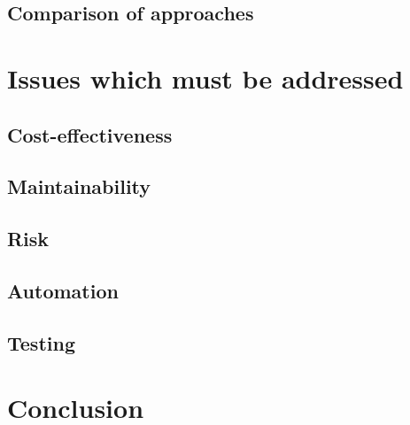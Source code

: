 \documentclass[12pt,journal,compsoc]{IEEEtran}
\begin{document}
\subsection{Comparison of approaches}
\label{subsec:comparison}

\section{Issues which must be addressed}
\label{sec:issues}

\subsection{Cost-effectiveness}
\label{subsec:costeffectiveness}

\subsection{Maintainability}
\label{subsec:maintainability}

\subsection{Risk}
\label{subsec:risk}

\subsection{Automation}
\label{subsec:automation}

\subsection{Testing}
\label{subsec:testing}

\section{Conclusion}
\label{sec:conclusion}

\appendices

\end{document}
